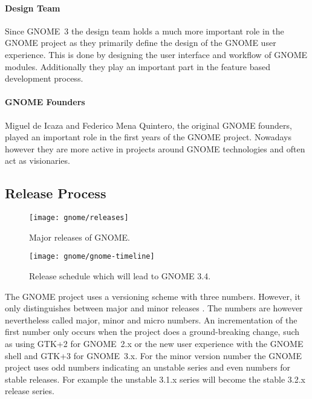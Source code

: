 \paragraph{Design Team}

Since GNOME~3 the design team holds a much more important role in the GNOME
project as they primarily define the design of the GNOME user experience. This
is done by designing the user interface and workflow of GNOME modules.
Additionally they play an important part in the feature based development
process.

\paragraph{GNOME Founders}

Miguel de Icaza and Federico Mena Quintero, the original GNOME founders, played
an important role in the first years of the GNOME project. Nowadays however
they are more active in projects around GNOME technologies and often act as
visionaries.


\subsection{Release Process} %

\begin{figure}[htbp]
  \centering
  \texttt{[image: gnome/releases]}
  \caption[Major Releases of GNOME]{Major releases of GNOME.}
\end{figure}

\begin{figure}[hbtp]
  \centering
  \texttt{[image: gnome/gnome-timeline]}
  \caption[GNOME 3.4 Release Schedule]{Release schedule which will lead to GNOME 3.4.}
\end{figure}

The GNOME project uses a versioning scheme with three numbers. However, it only
distinguishes between major and minor releases
\cite{GNOMEDevelopmentSchedule,GNOMESchedule}. The numbers are however
nevertheless called major, minor and micro numbers. An incrementation of the
first number only occurs when the project does a ground-breaking change, such
as using \ac{GTK}+2 for GNOME~2.x or the new user experience with the GNOME
shell and \ac{GTK}+3 for GNOME~3.x. For the minor version number the GNOME
project uses odd numbers indicating an unstable series and even numbers for
stable releases. For example the unstable 3.1.x series will become the stable
3.2.x release series.

